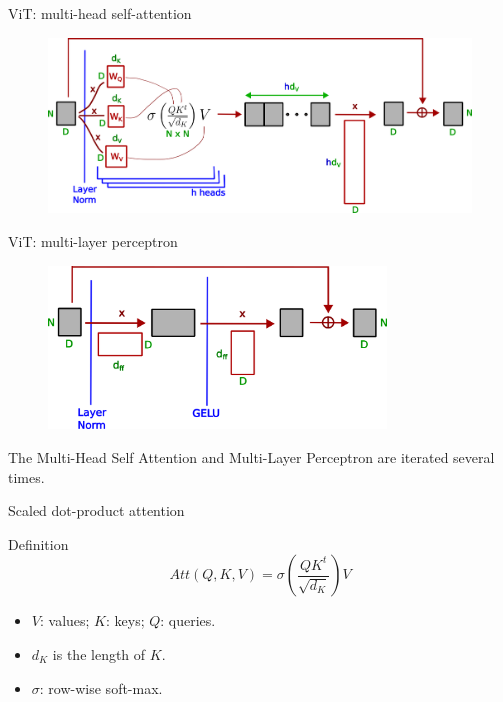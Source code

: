 \documentclass[xcolor=pdftex,dvipsnames,table,mathserif]{beamer}
\begin{document}
\begin{frame}{ViT: multi-head self-attention}

\begin{figure}[ht]
  \centering
  \includegraphics[width=\textwidth]{vit_illustration2}
\end{figure}


\end{frame}


\begin{frame}{ViT: multi-layer perceptron}

\begin{figure}[ht]
  \centering
  \includegraphics[width=0.8\textwidth]{vit_illustration3}
\end{figure}

\pause

The Multi-Head Self Attention and Multi-Layer Perceptron are iterated several times.

\end{frame}


\begin{frame}{Scaled dot-product attention}

  \begin{block}{Definition}
    \[Att(Q,K,V) = \sigma\left(\frac{QK^t}{\sqrt{d_{K}}}\right) V \]
  \end{block}

  \begin{itemize}
  \item $V$: values; $K$: keys; $Q$: queries.
  \item $d_{K}$ is the length of $K$.
  \item $\sigma$: row-wise soft-max.
  \end{itemize}


\end{frame}
\end{document}
